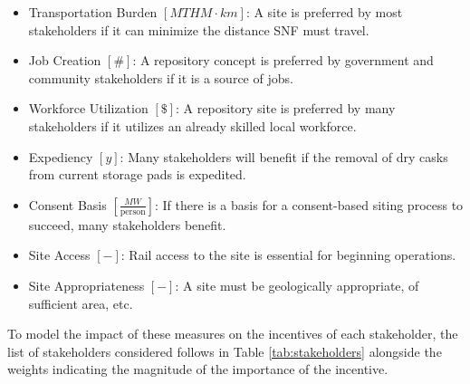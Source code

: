 \begin{itemize}
        \item Transportation Burden $[MTHM \cdot km]$: A site is preferred by 
                most stakeholders if it can minimize the distance \gls{SNF} 
                must travel.
        \item Job Creation $[\#]$: A repository concept is preferred by 
                government and community stakeholders if it is a source of 
                jobs. 
        \item Workforce Utilization $[\$]$: A repository site is preferred by 
                many stakeholders if it utilizes an already skilled local 
                workforce. 
        \item Expediency $[y]$: Many stakeholders will benefit if the removal 
                of dry casks from current storage pads is expedited.
        \item Consent Basis $[\frac{MW}{\mbox{person}}]$: If there is a basis for a consent-based 
                siting process to succeed, many stakeholders benefit.
        \item Site Access $[-]$: Rail access to the site is essential for 
                beginning operations.
        \item Site Appropriateness $[-]$: A site must be geologically 
                appropriate, of sufficient area, etc.
\end{itemize}

To model the impact of these measures on the incentives of each stakeholder, 
the list of stakeholders considered follows in Table \ref{tab:stakeholders} 
alongside the weights indicating the magnitude of the importance of the incentive.
 
 
\begin{table}[h]

\centering
\caption {Metrics and Weight for Each Stakeholder}
\end{table}

